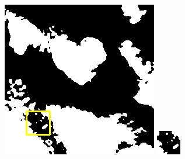 \documentclass[10pt,UTF8,fntef]{ctexart}
\begin{document}
\begin{figure}[H]
{{\begin{minipage}[b]{0.15\linewidth}
            \includegraphics[width=1\linewidth]{../log/spoon3/cut/LC80290372013257LGN00_17086_unet.jpg}\vspace{4pt}
            \includegraphics[width=1\linewidth]{../log/spoon3/cut/tmp_cut_LC80290372013257LGN00_17086_unet.jpg}\vspace{4pt}

\end{minipage}}}
\end{figure}
\end{document}

